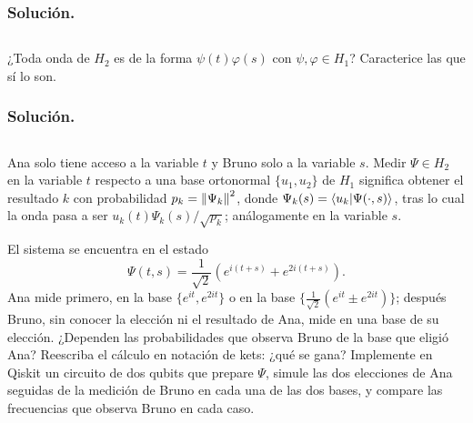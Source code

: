 \documentclass[12pt]{article}
\begin{document}
\color{Black}

\subsubsection*{Solución.}




\color{rojoUN}

\subsection{}

¿Toda onda de $H_2$ es de la forma $\psi(t)\varphi(s)$ con $\psi, \varphi \in H_1$? Caracterice las que sí lo son.

\color{Black}

\subsubsection*{Solución.}




\color{rojoUN}

\subsection{}

Ana solo tiene acceso a la variable $t$ y Bruno solo a la variable $s$. Medir $\Psi \in H_2$ en la variable $t$ respecto a una base ortonormal $\{u_1, u_2\}$ de $H_1$ significa obtener el resultado $k$ con probabilidad $p_k = \norm{\Psi_k}^2$, donde $\Psi_k(s) = \braket{u_k}{\Psi(\cdot, s)}$, tras lo cual la onda pasa a ser $u_k(t)\Psi_k(s)/\sqrt{p_k}$; análogamente en la variable $s$.

El sistema se encuentra en el estado
    \[
    \Psi(t,s) = \frac{1}{\sqrt{2}}\left(e^{i(t+s)} + e^{2i(t+s)}\right).
    \]
    Ana mide primero, en la base $\{e^{it}, e^{2it}\}$ o en la base $\{\frac{1}{\sqrt{2}}(e^{it} \pm e^{2it})\}$; después Bruno, sin conocer la elección ni el resultado de Ana, mide en una base de su elección. ¿Dependen las probabilidades que observa Bruno de la base que eligió Ana? Reescriba el cálculo en notación de kets: ¿qué se gana? Implemente en Qiskit un circuito de dos qubits que prepare $\Psi$, simule las dos elecciones de Ana seguidas de la medición de Bruno en cada una de las dos bases, y compare las frecuencias que observa Bruno en cada caso.
\end{document}
